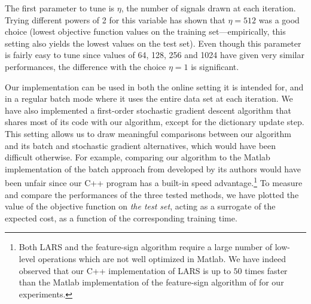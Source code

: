 \documentclass[twoside,11pt]{article}
\begin{document}
The first parameter to tune is $\eta$, the number of signals drawn at each
iteration.  Trying different powers of 2 for this variable has shown that
$\eta=512$ was a good choice (lowest objective function values on the training
set---empirically, this setting also yields the lowest values on the test
set). Even though this parameter is fairly easy to tune since values of 64,
128, 256 and 1024 have given very similar performances, the difference with
the choice $\eta=1$ is significant.

Our implementation can be used in both the online setting it is intended for,
and in a regular batch mode where it uses the entire data set at each iteration.
We have also
implemented a first-order stochastic gradient descent algorithm that shares
most of its code with our algorithm, except for the dictionary update step.
This setting allows us to draw meaningful comparisons between our algorithm
and its batch and stochastic gradient alternatives, which would have been
difficult otherwise. For example, comparing our algorithm to the Matlab
implementation of the batch approach from \citet{lee} developed by its authors
would have been unfair since our C++ program has a built-in speed
advantage.\footnote{Both LARS and the feature-sign algorithm \citep{lee} require
a large number of low-level operations which are not well optimized in Matlab.
We have indeed observed that our C++ implementation of LARS is up to $50$ times
faster than the Matlab implementation of the feature-sign algorithm of
\citet{lee} for our experiments.}
To measure and compare the performances of the three tested methods, we have
plotted the value of the objective function on {\em the test set},  acting as
a surrogate of the expected cost, as a function of the corresponding training
time.
\end{document}
